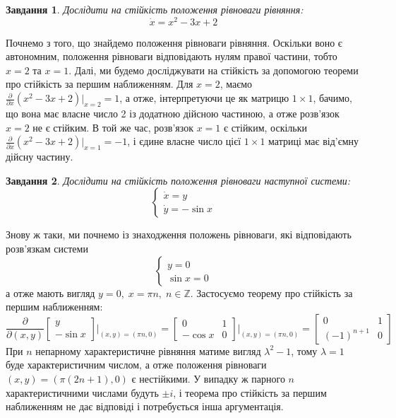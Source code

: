 \documentclass[12pt]{article} %
\newtheorem{prob}{Завдання}
\begin{document}
\begin{prob}Дослідити на стійкість положення рівноваги рівняння:\[\dot{x}=x^2-3x+2\]\end{prob}
Почнемо з того, що знайдемо положення рівноваги рівняння. Оскільки воно є автономним, положення рівноваги відповідають
нулям правої частини, тобто $x=2$ та $x=1$. Далі, ми будемо досліджувати на стійкість за допомогою теореми про стійкість за першим
наближенням. Для $x=2$, маємо $\frac{\partial}{\partial x}(x^2-3x+2)\bigg|_{x=2}=1$, а отже, інтерпретуючи це як матрицю
$1\times1$, бачимо, що вона має власне число 2 із додатною дійсною частиною, а отже розв’язок $x=2$ не є стійким. В той же час, 
розв’язок $x=1$ є стійким, оскільки $\frac{\partial}{\partial x}(x^2-3x+2)\bigg|_{x=1}=-1$, і єдине власне число цієї $1\times1$ 
матриці має від’ємну дійсну частину.
\begin{prob}Дослідити на стійкість положення рівноваги наступної системи:
	\[\begin{cases}\dot{x}=y\\\dot{y}=-\sin x\end{cases}\]\end{prob}
	Знову ж таки, ми почнемо із знаходження положень рівноваги,
	які відповідають розв’язкам системи \[\begin{cases}y=0\\\sin x=0\end{cases}\]
	а отже мають вигляд $y=0,\;x=\pi n,\;n\in\mathbb{Z}$. Застосуємо теорему про стійкість за першим наближенням:
	\[\frac{\partial}{\partial (x,y)} \begin{bmatrix}y\\-\sin x\end{bmatrix}\bigg|_{(x,y)=(\pi n,0)}
		=\begin{bmatrix}0&1\\-\cos x&0\end{bmatrix}\bigg|_{(x,y)=(\pi n,0)}=\begin{bmatrix}0&1\\(-1)^{n+1}&0\end{bmatrix}\]
	При $n$ непарному характеристичне рівняння матиме вигляд $\lambda^2-1$, тому $\lambda=1$ буде характеристичним числом,
	а отже положення рівноваги $(x,y)=(\pi(2n+1),0)$ є нестійкими. У випадку ж парного $n$ характеристичними числами будуть
	$\pm i$, і теорема про стійкість за першим наближенням не дає відповіді і потребується інша аргументація. 
	
\end{document}
